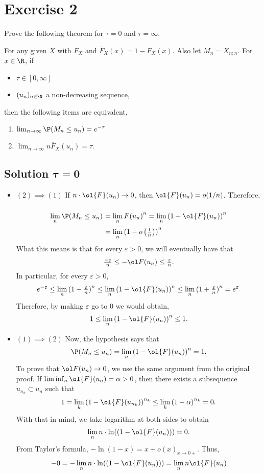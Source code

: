 \section{Exercise 2}
Prove the following theorem for $\tau = 0$ and $\tau = \infty$.

\begin{theorem}
    For any given $X$ with $F_X$ and $\overline{F}_X(x) = 1- F_X(x)$. Also let $M_n = X_{n:n}$. For $x\in \R$, if
    \begin{itemize}
        \item $\tau \in [0,\infty]$
        \item $(u_n)_{n\in\N}$ a non-decreasing sequence,
    \end{itemize}
    then the following items are equivalent,
    \begin{enumerate}
        \item $\lim_{n\to\infty} \P(M_n \leq u_n) = e^{-\tau}$
        \item $\lim_{n\to\infty} n \overline{F}_X(u_n) = \tau$.
    \end{enumerate}
\end{theorem}

\subsection*{Solution $\boldsymbol{\tau = 0}$}

\begin{itemize}
    \item $(2)\implies (1)$ If $n\cdot \ol{F}(u_n) \to 0$, then $\ol{F}(u_n) = o(1/n)$. Therefore,
    
    \[ \everymath{\displaystyle}
    \arraycolsep=1.8pt\def\arraystretch{1.8}
    \begin{array}{rll}
        \lim_n \P(M_n \leq u_n) & = \lim_n {F(u_n)}^n = \lim_n {(1-\ol{F}(u_n))}^n\\
        & = \lim_n {(1-o\left( \tfrac{1}{n} \right))}^n
    \end{array} \]
    What this means is that for every $\varepsilon > 0$, we will eventually have that 
    \[ \tfrac{-\varepsilon}{n} \leq  -\ol F(u_n) \leq \tfrac{\varepsilon}{n}. \]
    In particular, for every $\varepsilon > 0$,
    \[e^{-\varepsilon} \leq \lim_n {(1-\tfrac{\varepsilon}{n})}^n \leq \lim_n {(1-\ol{F}(u_n))}^n \leq \lim_n {(1+\tfrac{\varepsilon}{n})}^n = e^{\varepsilon}. \]
    Therefore, by making $\varepsilon$ go to $0$ we would obtain,
    \[ 1 \leq \lim_n {(1-\ol{F}(u_n))}^n \leq 1. \]
    \item $(1)\implies (2)$ Now, the hypothesis says that
    \[ \P(M_n \leq u_n) = \lim_n {(1-\ol{F}(u_n))}^n = 1. \]
    To prove that $\ol F(u_n) \to 0$, we use the same argument from the original proof. If $\liminf_n \ol{F}(u_n) = \alpha > 0$, then there exists a subsequence $u_{n_k} \subset u_n$ such that 
    \[ 1 = \lim_k {(1-\ol{F}(u_{n_k}))}^{n_k} \leq \lim_k {(1-\alpha)}^{n_k} = 0. \]
    With that in mind, we take logarithm at both sides to obtain
    \[ \lim_n n\cdot \ln((1-\ol{F}(u_{n}))) = 0.\]
    From Taylor's formula, $- \ln(1-x) = x + o(x)_{x\to 0+}$. Thus,
    \[ -0 = - \lim_n n\cdot \ln((1-\ol{F}(u_{n}))) = \lim_n n \ol{F}(u_{n}) \]
\end{itemize}

